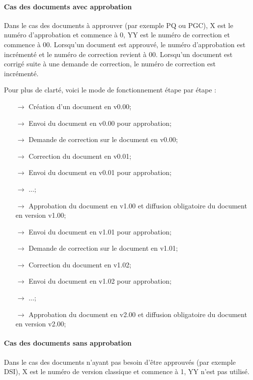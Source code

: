 \paragraph{Cas des documents avec approbation\\}

Dans le cas des documents à approuver (par exemple PQ ou PGC), X est le numéro d'approbation et commence à 0, YY est le numéro de correction et commence à 00. Lorsqu'un document est approuvé, le numéro d'approbation est incrémenté et le numéro de correction revient à 00. Lorsqu'un document est corrigé suite à une demande de correction, le numéro de correction est incrémenté.

Pour plus de clarté, voici le mode de fonctionnement étape par étape : 
\begin{itemize}
\item[$\rightarrow$] Création d'un document en v0.00;
\item[$\rightarrow$] Envoi du document en v0.00 pour approbation;
\item[$\rightarrow$] Demande de correction sur le document en v0.00;
\item[$\rightarrow$] Correction du document en v0.01;
\item[$\rightarrow$] Envoi du document en v0.01 pour approbation;
\item[$\rightarrow$] ...;
\item[$\rightarrow$] Approbation du document en v1.00 et diffusion obligatoire du document en version v1.00;
\item[$\rightarrow$] Envoi du document en v1.01 pour approbation;
\item[$\rightarrow$] Demande de correction sur le document en v1.01;
\item[$\rightarrow$] Correction du document en v1.02;
\item[$\rightarrow$] Envoi du document en v1.02 pour approbation;
\item[$\rightarrow$] ...;
\item[$\rightarrow$] Approbation du document en v2.00 et diffusion obligatoire du document en version v2.00;
\end{itemize}

\paragraph{Cas des documents sans approbation\\}

Dans le cas des documents n'ayant pas besoin d'être approuvés (par exemple DSI), X est le numéro de version classique et commence à 1, YY n'est pas utilisé.

